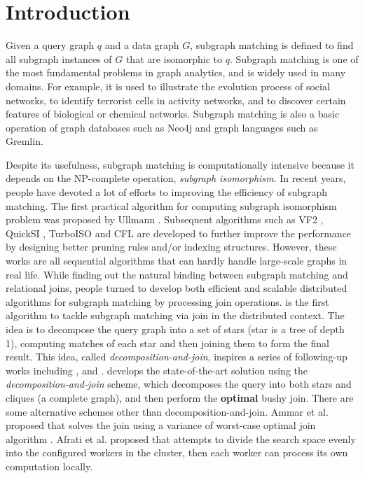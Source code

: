 \section{Introduction}
\label{sec:intro}
Given a query graph $q$ and a data graph $G$, subgraph matching is defined to find all subgraph instances of $G$ that are isomorphic to $q$. Subgraph matching is one of the most fundamental problems in graph analytics, and is widely used in many domains. For example, it is used to illustrate the evolution process of social networks\cite{kairam2012life}, to identify terrorist cells in activity networks\cite{cook2006mining}, and to discover certain features of biological or chemical networks\cite{Cannataro2010}. Subgraph matching is also a basic operation of graph databases such as Neo4j\cite{neo4j} and graph languages such as Gremlin\cite{gremlin}.

 Despite its usefulness, subgraph matching is computationally intensive because it depends on the NP-complete operation, \textit{subgraph isomorphism}\cite{Shamir97}. In recent years, people have devoted a lot of efforts to improving the efficiency of subgraph matching. The first practical algorithm for computing subgraph isomorphism problem was proposed by Ullmann \cite{Ullmann1976}. Subsequent algorithms such as VF2 \cite{cordella2004sub}, QuickSI \cite{Shang2008}, TurboISO \cite{turbo-iso} and CFL\cite{bi-fei} are developed to further improve the performance by designing better pruning rules and/or indexing structures. However, these works are all sequential algorithms that can hardly handle large-scale graphs in real life. While finding out the natural binding between subgraph matching and relational joins, people turned to develop both efficient and scalable distributed algorithms for subgraph matching by processing join operations. \starjoin \cite{star-join} is the first algorithm to tackle subgraph matching via join in the distributed context. The idea is to decompose the query graph into a set of stars (star is a tree of depth 1), computing matches of each star and then joining them to form the final result. This idea, called \textit{decomposition-and-join}, inspires a series of following-up works including \psgl \cite{Shao2014}, \ttjoin \cite{Lai2015} and \cliquejoin \cite{Lai2016}. \cliquejoin develops the state-of-the-art solution using the \textit{decomposition-and-join} scheme, which decomposes the query into both stars and cliques (a complete graph), and then perform the \textbf{optimal} bushy join. There are some alternative schemes other than decomposition-and-join. Ammar et al. proposed \bigjoin that solves the join using a variance of worst-case optimal join algorithm \cite{generic-join}. Afrati et al. proposed \multiwayjoin \cite{AfratiFU13}  that attempts to divide the search space evenly into the configured workers in the cluster, then each worker can process its own computation locally. 

